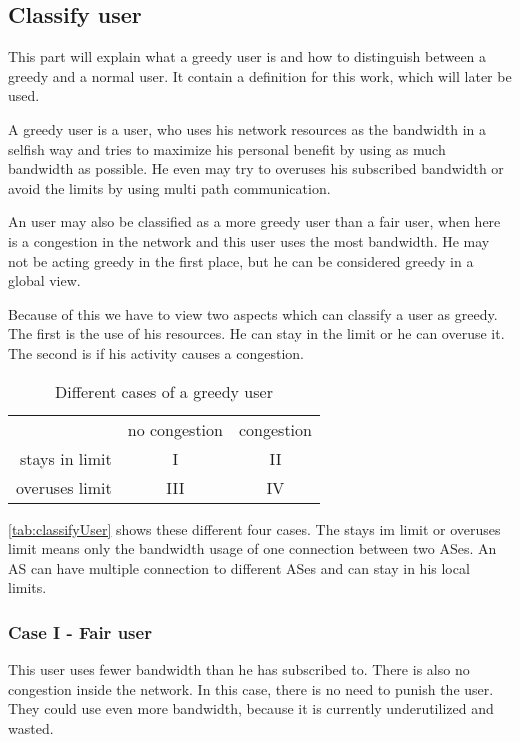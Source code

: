 \documentclass[thesis.tex]{subfiles}
\begin{document}
\subsection{Classify user}
This part will explain what a greedy user is and how to distinguish between a greedy and a normal user. It contain a definition for this work, which will later be used.

A greedy user is a user, who uses his network resources as the bandwidth in a selfish way and tries to maximize his personal benefit by using as much bandwidth as possible. He even may try to overuses his subscribed bandwidth or avoid the limits by using multi path communication.

An user may also be classified as a more greedy user than a fair user, when here is a congestion in the network and this user uses the most bandwidth. He may not be acting greedy in the first place, but he can be considered greedy in a global view.

Because of this we have to view two aspects which can classify a user as greedy. The first is the use of his resources. He can stay in the limit or he can overuse it. The second is if his activity causes a congestion.
\begin{table}[h]
    \centering
    \begin{tabular}{ r|c|c| }
        \multicolumn{1}{r}{}
        &  \multicolumn{1}{c}{no congestion}
        & \multicolumn{1}{c}{congestion} \\
        \cline{2-3}
        stays in limit & I & II \\
        \cline{2-3}
        overuses limit & III & IV \\
        \cline{2-3}
    \end{tabular}
    \caption{Different cases of a greedy user}
    \label{tab:classifyUser}    
\end{table}

\autoref{tab:classifyUser} shows these different four cases. The stays im limit or overuses limit means only the bandwidth usage of one connection between two ASes. An AS can have multiple connection to different ASes and can stay in his local limits.

\subsubsection{Case I - Fair user} \label{sub:main:detection:case1}
This user uses fewer bandwidth than he has subscribed to. There is also no congestion inside the network. In this case, there is no need to punish the user. They could use even more bandwidth, because it is currently underutilized and wasted.
\end{document}
